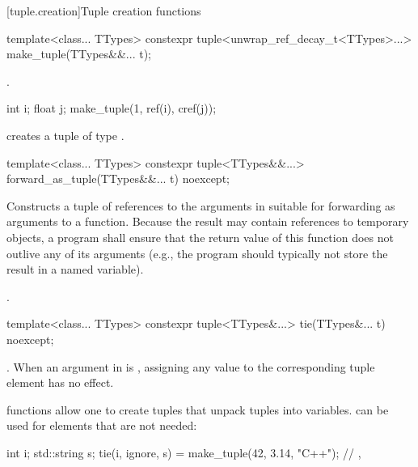 [tuple.creation]{Tuple creation functions}

%
%
\begin{itemdecl}
template<class... TTypes>
  constexpr tuple<unwrap_ref_decay_t<TTypes>...> make_tuple(TTypes&&... t);
\end{itemdecl}

\begin{itemdescr}
\pnum
\returns
{}.

\pnum
\begin{example}
\begin{codeblock}
int i; float j;
make_tuple(1, ref(i), cref(j));
\end{codeblock}
creates a tuple of type .
\end{example}
\end{itemdescr}

%
%
\begin{itemdecl}
template<class... TTypes>
  constexpr tuple<TTypes&&...> forward_as_tuple(TTypes&&... t) noexcept;
\end{itemdecl}

\begin{itemdescr}
\pnum
\effects
Constructs a tuple of references to the arguments in  suitable
for forwarding as arguments to a function. Because the result may contain references
to temporary objects, a program shall ensure that the return value of this
function does not outlive any of its arguments (e.g., the program should typically
not store the result in a named variable).

\pnum
\returns
{}.
\end{itemdescr}

%
%
%
\begin{itemdecl}
template<class... TTypes>
  constexpr tuple<TTypes&...> tie(TTypes&... t) noexcept;
\end{itemdecl}

\begin{itemdescr}
\pnum
\returns
{}.  When an
argument in  is , assigning
any value to the corresponding tuple element has no effect.

\pnum
\begin{example}
 functions allow one to create tuples that unpack
tuples into variables.  can be used for elements that
are not needed:
\begin{codeblock}
int i; std::string s;
tie(i, ignore, s) = make_tuple(42, 3.14, "C++");
// , 
\end{codeblock}
\end{example}
\end{itemdescr}


